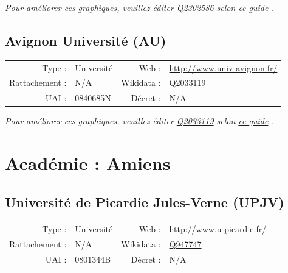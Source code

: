 \documentclass[12pt,french,landscape]{article}
\begin{document}
\textit{\scriptsize Pour améliorer ces graphiques, veuillez éditer \href{https://www.wikidata.org/entity/Q2302586}{Q2302586}  selon \href{https://github.com/cpesr/wikidataESR/blob/master/Rmd/wikidataESR.md}{ce guide}}
.


\newpage

\hypertarget{avignon-universituxe9-au}{%
\subsection{Avignon Université (AU)}\label{avignon-universituxe9-au}}

\begin{tabular*}{0.45\textwidth}{rp{2cm}rl}  
\hline  
Type : & Université & Web : &\href{http://www.univ-avignon.fr/}{http://www.univ-avignon.fr/} \\  
Rattachement : & N/A & Wikidata : & \href{https://www.wikidata.org/entity/Q2033119}{Q2033119} \\  
UAI : & 0840685N & Décret : & N/A \\  
\hline  
\end{tabular*}

\textit{\scriptsize Pour améliorer ces graphiques, veuillez éditer \href{https://www.wikidata.org/entity/Q2033119}{Q2033119}  selon \href{https://github.com/cpesr/wikidataESR/blob/master/Rmd/wikidataESR.md}{ce guide}}
.


\newpage

\hypertarget{acaduxe9mie-amiens}{%
\section{Académie : Amiens}\label{acaduxe9mie-amiens}}

\hypertarget{universituxe9-de-picardie-jules-verne-upjv}{%
\subsection{Université de Picardie Jules-Verne
(UPJV)}\label{universituxe9-de-picardie-jules-verne-upjv}}

\begin{tabular*}{0.45\textwidth}{rp{2cm}rl}  
\hline  
Type : & Université & Web : &\href{http://www.u-picardie.fr/}{http://www.u-picardie.fr/} \\  
Rattachement : & N/A & Wikidata : & \href{https://www.wikidata.org/entity/Q947747}{Q947747} \\  
UAI : & 0801344B & Décret : & N/A \\  
\hline  
\end{tabular*}
\end{document}
